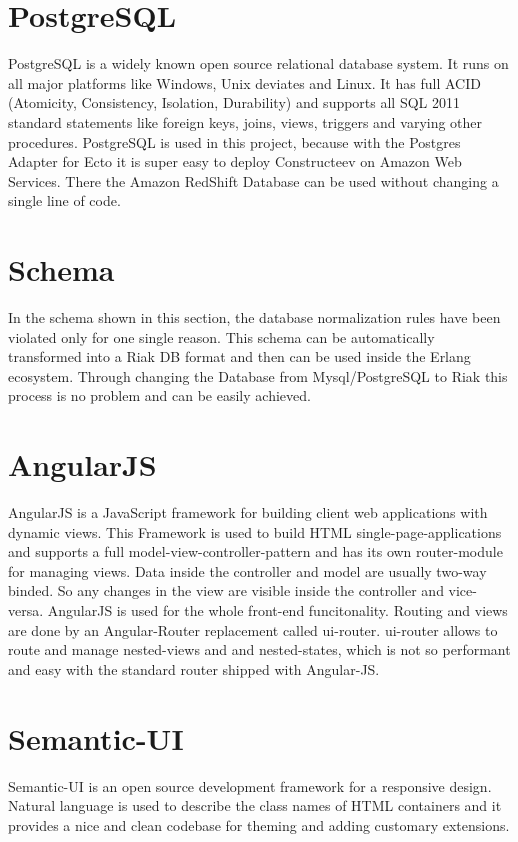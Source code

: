 \section{PostgreSQL}
PostgreSQL is a widely known open source relational database system. It runs on all major platforms like Windows, Unix deviates and Linux. It has full ACID (Atomicity, Consistency, Isolation, Durability) and supports all SQL 2011 standard statements like foreign keys, joins, views, triggers and varying other procedures.
 \textcolor{newcode}{PostgreSQL is used in this project, because with the Postgres Adapter for Ecto it is super easy to deploy Constructeev on Amazon Web Services. There the Amazon RedShift Database can be used without changing a single line of code.}

\section{Schema}
In the schema shown in this section, the database normalization rules have been violated only for one single reason. This schema can be automatically transformed into a Riak DB format and then can be used inside the Erlang ecosystem. Through changing the Database from Mysql/PostgreSQL to Riak this process is no problem and can be easily achieved.

\section{AngularJS}
AngularJS is a JavaScript framework for building client web applications with dynamic views. This Framework is used to build HTML single-page-applications and supports a full model-view-controller-pattern and has its own router-module for managing views. Data inside the controller and model are usually two-way binded. So any changes in the view are visible inside the controller and vice-versa.
\textcolor{newcode}{AngularJS is used for the whole front-end funcitonality. Routing and views are done by an Angular-Router replacement called ui-router. ui-router allows to route and manage nested-views and and nested-states, which is not so performant and easy with the standard router shipped with Angular-JS.}

\section{Semantic-UI}
Semantic-UI is an open source development framework for a responsive design. Natural language is used to describe the class names of HTML containers and it provides a nice and clean codebase for theming and adding customary extensions. 

